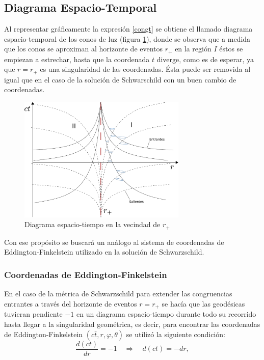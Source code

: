 \subsection{Diagrama Espacio-Temporal}

Al representar gr\'aficamente la expresi\'on \eqref{congt} se obtiene el llamado diagrama espacio-temporal de los conos de luz (figura \ref{fig:conos1}), donde se observa que a medida que los conos se aproximan al horizonte de eventos $r_+$ en la regi\'on $I$ \'estos se empiezan a estrechar, hasta que la coordenada $t$ diverge, como es de esperar, ya que $r=r_+$ es una singularidad de las coordenadas. \'Esta puede ser removida al igual que en el caso de la soluci\'on de Schwarschild con un buen cambio de coordenadas.

 \begin{figure}[H]
 \centering
\includegraphics[height=6cm,angle=0]{fig/fig-conos1.pdf}
\caption{Diagrama espacio-tiempo en la vecindad de $r_+$}
\label{fig:conos1}
\end{figure}
  
Con ese prop\'osito se buscar\'a un an\'alogo al sistema de coordenadas de Eddington-Finkelstein utilizado en la soluci\'on de Schwarzschild. 

\subsubsection{Coordenadas de Eddington-Finkelstein} 

En el caso de la m\'etrica de Schwarzschild para extender las congruencias entrantes a trav\'es del horizonte de eventos $r=r_+$ se hac\'ia que las geod\'esicas tuvieran pendiente $-1$ en un diagrama espacio-tiempo durante todo su recorrido hasta llegar a la singularidad geom\'etrica, es decir, para encontrar las coordenadas de Eddington-Finkelstein $(c\bar{t},r,\varphi,\theta)$ se utiliz\'o la siguiente condici\'on: 
\begin{equation}
\frac{d(ct)}{dr}=-1 \quad \Rightarrow \quad d(ct)=-dr,
\end{equation}

